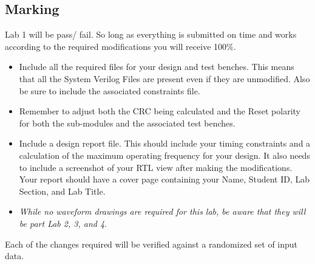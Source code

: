 \subsection{Marking}
Lab 1 will be pass/ fail. So long as everything is submitted on time and works according to the required modifications you will receive 100\%. 

\begin{itemize}
    \item Include all the required files for your design and test benches. This means that all the System Verilog Files are present even if they are unmodified. Also be sure to include the associated constraints file.
    \item Remember to adjust both the CRC being calculated and the Reset polarity for both the sub-modules and the associated test benches. 
    \item Include a design report file. This should include your timing constraints and a calculation of the maximum operating frequency for your design. It also needs to include a screenshot of your RTL view after making the modifications. Your report should have a cover page containing your Name, Student ID, Lab Section, and Lab Title. 
    \item \textit{While no waveform drawings are required for this lab, be aware that they will be part Lab 2, 3, and 4}. 
\end{itemize}

Each of the changes required will be verified against a randomized set of input data.\\
